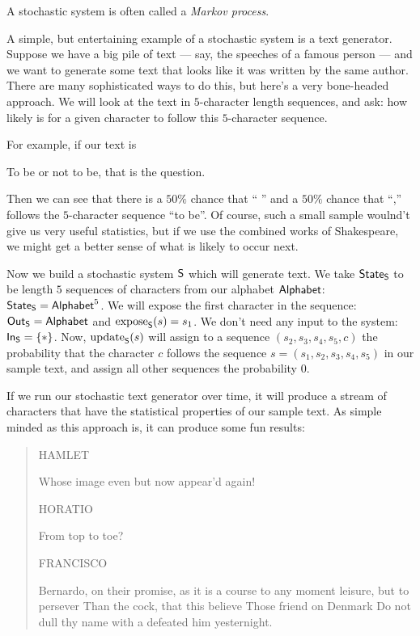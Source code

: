 \documentclass[DynamicalBook]{subfiles}
\begin{document}
\begin{remark}
 A stochastic system is often called a \emph{Markov process}. 
\end{remark}

\begin{example}\label{ex.markov_text_generator}
  A simple, but entertaining example of a stochastic system is a text generator.
  Suppose we have a big pile of text --- say, the speeches of a famous person
  --- and we want to generate some text that looks like it was written by the
  same author. There are many sophisticated ways to do this, but here's a very
  bone-headed approach. We will look at the text in $5$-character length
  sequences, and ask: how likely is for a given character to follow this
  $5$-character sequence.

  For example, if our text is
  \begin{center}
To be or not to be, that is the question.
  \end{center}
Then we can see that there is a $50\%$ chance that `` '' and a $50\%$ chance
that ``,'' follows the $5$-character sequence ``to be''. Of course, such a small
sample woulnd't give us very useful statistics, but if we use the combined works
of Shakespeare, we might get a better sense of what is likely to occur next.

Now we build a stochastic system $\mathsf{S}$ which will generate text. We take
$\mathsf{State}_{\mathsf{S}}$ to be length $5$ sequences of characters from our alphabet
$\mathsf{Alphabet}$: $\mathsf{State}_{\mathsf{S}} = \mathsf{Alphabet}^5$. We will
expose the first character in the sequence: $\mathsf{Out}_{\mathsf{S}} = \mathsf{Alphabet}$ and $\mathrm{expose}_{\mathsf{S}}(s) = s_1$. We don't need any
input to the system: $\mathsf{In}_{\mathsf{S}} = \{\ast\}$. Now, $\mathrm{update}_{\mathsf{S}}(s)$ will assign to a
sequence $(s_2, s_3, s_4, s_5, c)$ the probability that the character $c$
follows the sequence $s = (s_1, s_2, s_3, s_4, s_5)$ in our sample text, and
assign all other sequences the probability $0$.

If we run our stochastic text generator over time, it will produce a stream of
characters that have the statistical properties of our sample text. As simple
minded as this approach is, it can produce some fun results:
\begin{quote}
  HAMLET

    Whose image even but now appear'd again!

HORATIO

    From top to toe?

FRANCISCO

    Bernardo, on their promise, as it is a course to any moment leisure, but to persever
    Than the cock, that this believe
    Those friend on Denmark
    Do not dull thy name with a defeated him yesternight.
\end{quote}


\end{example}
\end{document}
